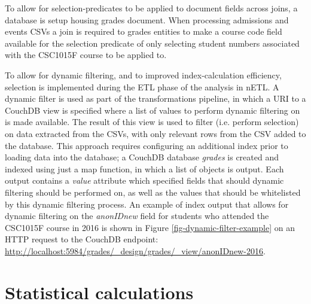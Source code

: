 To allow for selection-predicates to be applied to document fields across joins, a database is setup housing grades document. When processing admissions and events CSVs a join is required to grades entities to make a course code field available for the selection predicate of only selecting student numbers associated with the CSC1015F course to be applied to.


To allow for dynamic filtering, and to improved index-calculation efficiency, selection is implemented during the ETL phase of the analysis in nETL. A dynamic filter is used as part of the transformations pipeline, in which a URI to a CouchDB view is specified where a list of values to perform dynamic filtering on is made available. The result of this view is used to filter (i.e. perform selection) on data extracted from the CSVs, with only relevant rows from the CSV added to the database. This approach requires configuring an additional index prior to loading data into the database; a CouchDB database \textit{grades} is created and indexed using just a map function, in which a list of objects is output. Each output contains a \textit{value} attribute which specified fields that should dynamic filtering should be performed on, as well as the values that should be whitelisted by this dynamic filtering process. An example of index output that allows for dynamic filtering on the \textit{anonIDnew} field for students who attended the CSC1015F course in 2016 is shown in Figure \ref{fig-dynamic-filter-example} on an HTTP request to the CouchDB endpoint: \url{http://localhost:5984/grades/_design/grades/_view/anonIDnew-2016}.



\section{Statistical calculations}
